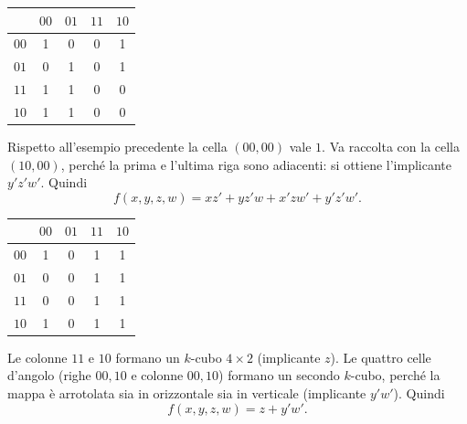 \documentclass[11pt,a4paper]{article}
\begin{document}
\begin{esempio}
\begin{center}
\begin{tabular}{c|cccc}
 & $00$ & $01$ & $11$ & $10$ \\
\midrule
$00$ & 1 & 0 & 0 & 1 \\
$01$ & 0 & 1 & 0 & 1 \\
$11$ & 1 & 1 & 0 & 0 \\
$10$ & 1 & 1 & 0 & 0 \\
\end{tabular}
\end{center}
Rispetto all'esempio precedente la cella $(00, 00)$ vale $1$. Va raccolta con la cella $(10, 00)$, perché la prima e l'ultima riga sono adiacenti: si ottiene l'implicante $y'z'w'$. Quindi
\[
f(x,y,z,w) = xz' + yz'w + x'zw' + y'z'w'.
\]
\end{esempio}

\begin{esempio}
\begin{center}
\begin{tabular}{c|cccc}
 & $00$ & $01$ & $11$ & $10$ \\
\midrule
$00$ & 1 & 0 & 1 & 1 \\
$01$ & 0 & 0 & 1 & 1 \\
$11$ & 0 & 0 & 1 & 1 \\
$10$ & 1 & 0 & 1 & 1 \\
\end{tabular}
\end{center}
Le colonne $11$ e $10$ formano un $k$-cubo $4 \times 2$ (implicante $z$). Le quattro celle d'angolo (righe $00,10$ e colonne $00,10$) formano un secondo $k$-cubo, perché la mappa è arrotolata sia in orizzontale sia in verticale (implicante $y'w'$). Quindi
\[
f(x,y,z,w) = z + y'w'.
\]
\end{esempio}
\end{document}
